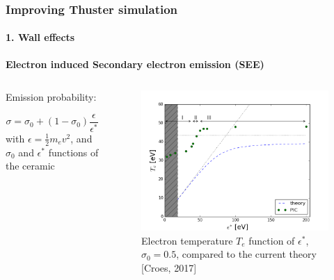 \documentclass[sans, aspectratio=169]{beamer}
\begin{document}
\begin{frame} 
	\frametitle{Improving Thuster simulation} 
	\framesubtitle{ 1. Wall effects} 
	\textbf{Electron induced Secondary electron emission (SEE)}
	\begin{columns}

		\begin{column}{0.4\linewidth}
	
		
	\begin{block}{Emission probability:}
	
	$$\sigma = \sigma _0 + (1 - \sigma _0)\frac{\epsilon}{\epsilon^*}$$
	with $\epsilon = \frac{1}{2} m_e v^2$, and $\sigma_0$ and $\epsilon^*$ functions of the ceramic  
	\end{block}
		
		\end{column}
	
		\begin{column}{0.6\linewidth}
			\begin{figure}[hbtp]
				\centering
				\includegraphics[scale=0.3]{images/Te_epsilon.png}
				\caption{Electron temperature $T_e$ function of $\epsilon^*$, $\sigma_0 = 0.5$, compared to the current theory [Croes, 2017]}
			\end{figure}
		\end{column}


	\end{columns}
	
\end{frame}
\end{document}
